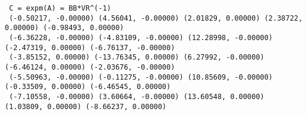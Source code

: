 \documentclass{article}
\begin{document}
\begin{small}
\begin{verbatim}
 C = expm(A) = BB*VR^(-1)
 (-0.50217, -0.00000) (4.56041, -0.00000) (2.01829, 0.00000) (2.38722, 0.00000) (-0.98493, 0.00000)
 (-6.36228, -0.00000) (-4.83109, -0.00000) (12.28998, -0.00000) (-2.47319, 0.00000) (-6.76137, -0.00000)
 (-3.85152, 0.00000) (-13.76345, 0.00000) (6.27992, -0.00000) (-6.46124, 0.00000) (-2.03676, -0.00000)
 (-5.50963, -0.00000) (-0.11275, -0.00000) (10.85609, -0.00000) (-0.33509, 0.00000) (-6.46545, 0.00000)
 (-7.10558, -0.00000) (3.60664, -0.00000) (13.60548, 0.00000) (1.03809, 0.00000) (-8.66237, 0.00000)
\end{verbatim}
\end{small}
\end{document}
